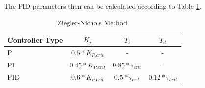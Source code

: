 The PID parameters then can be calculated according to Table \ref{tab:ziegler}.

\begin{table}[H]
\begin{center}
\begin{tabular}{ l | c | c | c}
  Controller Type & $K_p$ & $T_i$ & $T_d$\\
  \hline
  \hline
  P & $0.5 * K_{P.crit}$& - & -\\
  \hline
  PI & $0.45 * K_{P.crit}$ & $0.85 * \tau_{crit}$ & - \\
  \hline
  PID & $0.6 * K_{P.crit}$ & $0.5 * \tau_{crit}$ & $0.12 * \tau_{crit}$\\
  \hline
\end{tabular}
\end{center}
\caption{Ziegler-Nichols Method}
\label{tab:ziegler}
\end{table}
